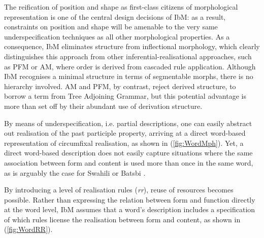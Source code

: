 \documentclass[output=paper
	        ,collection
	        ,collectionchapter
 	        ,biblatex
                ,babelshorthands
                ,newtxmath
                ,draftmode
                ,colorlinks, citecolor=brown
]{langscibook}
\begin{document}
\begin{exe}
\begin{xlist}
\begin{exe}
  \ex \label{ex:mph} 

\end{exe}

The reification of position and shape as first-class citizens of
morphological representation is one of the central design decisions of
IbM: as a result, constraints on position and shape will be amenable
to the very same underspecification techniques as all other
morphological properties. As a consequence, IbM eliminates structure
from inflectional morphology, which clearly distinguishes this
approach from other inferential-realisational approaches, such as PFM or AM,
where order is derived from cascaded rule application.  Although IbM
recognises a minimal structure in terms of segmentable morphs, there
is no hierarchy involved. AM and PFM, by contrast, reject derived
structure, to borrow a term from Tree Adjoining Grammar, but this
potential advantage is more than set off by their abundant use of
derivation structure.

By means of underspecification, i.e. partial descriptions, one can
easily abstract out realisation of the past participle property,
arriving at a direct word-based representation of circumfixal
realisation, as shown in (\ref{fig:WordMph}).  Yet, a direct
word-based description does not easily capture situations where the
same association between form and content is used more than once in
the same word, as is arguably the case for Swahili
\citep{Stump93,Crysmann:Bonami:2016,Crysmann:Bonami:2017:HPSG} or Batsbi \citep{Harris09,Crysmann:2018:Batsbi}.

By  introducing a level of realisation rules (\textit{rr}), reuse
of resources becomes possible. Rather than expressing the relation
between form and function directly at the word level, IbM assumes that
a word's description includes a specification of which rules license
the realisation between form and content, as shown in 
(\ref{fig:WordRR}).



\end{xlist}
\end{exe}
\end{document}
